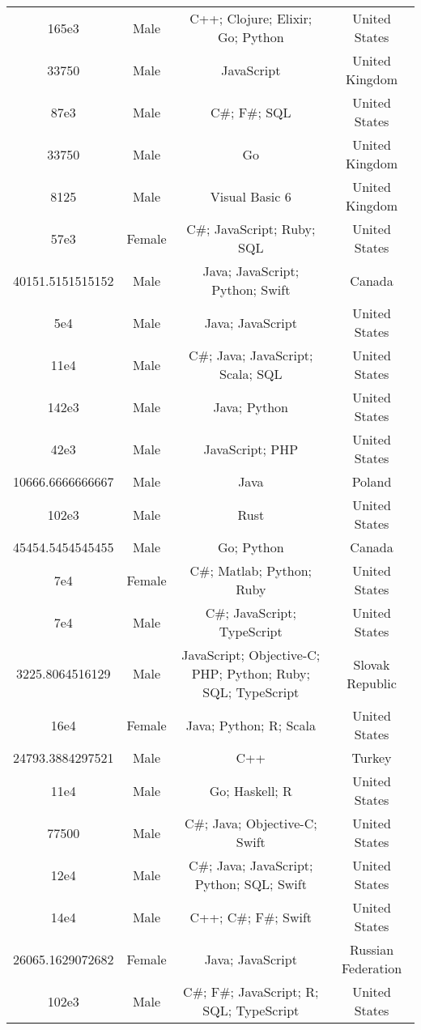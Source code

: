 \begin{center}
\begin{tabular}{ |c|c|c|c| }
165e3  &  Male  &  C++; Clojure; Elixir; Go; Python  &  United States  \\ 
33750  &  Male  &  JavaScript  &  United Kingdom  \\ 
87e3  &  Male  &  C\#; F\#; SQL  &  United States  \\ 
33750  &  Male  &  Go  &  United Kingdom  \\ 
8125  &  Male  &  Visual Basic 6  &  United Kingdom  \\ 
57e3  &  Female  &  C\#; JavaScript; Ruby; SQL  &  United States  \\ 
40151.5151515152  &  Male  &  Java; JavaScript; Python; Swift  &  Canada  \\ 
5e4  &  Male  &  Java; JavaScript  &  United States  \\ 
11e4  &  Male  &  C\#; Java; JavaScript; Scala; SQL  &  United States  \\ 
142e3  &  Male  &  Java; Python  &  United States  \\ 
42e3  &  Male  &  JavaScript; PHP  &  United States  \\ 
10666.6666666667  &  Male  &  Java  &  Poland  \\ 
102e3  &  Male  &  Rust  &  United States  \\ 
45454.5454545455  &  Male  &  Go; Python  &  Canada  \\ 
7e4  &  Female  &  C\#; Matlab; Python; Ruby  &  United States  \\ 
7e4  &  Male  &  C\#; JavaScript; TypeScript  &  United States  \\ 
3225.8064516129  &  Male  &  JavaScript; Objective-C; PHP; Python; Ruby; SQL; TypeScript  &  Slovak Republic  \\ 
16e4  &  Female  &  Java; Python; R; Scala  &  United States  \\ 
24793.3884297521  &  Male  &  C++  &  Turkey  \\ 
11e4  &  Male  &  Go; Haskell; R  &  United States  \\ 
77500  &  Male  &  C\#; Java; Objective-C; Swift  &  United States  \\ 
12e4  &  Male  &  C\#; Java; JavaScript; Python; SQL; Swift  &  United States  \\ 
14e4  &  Male  &  C++; C\#; F\#; Swift  &  United States  \\ 
26065.1629072682  &  Female  &  Java; JavaScript  &  Russian Federation  \\ 
102e3  &  Male  &  C\#; F\#; JavaScript; R; SQL; TypeScript  &  United States  \\ 

\end{tabular}
\end{center}
